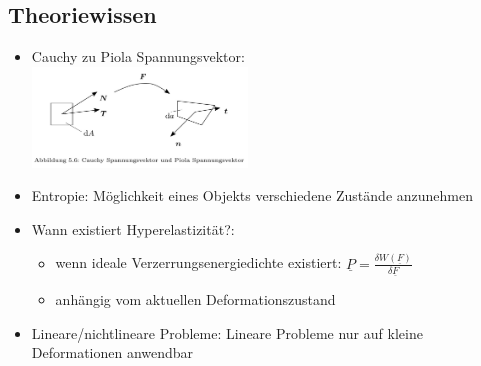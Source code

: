 \documentclass[fleqn,twoside]{article}
\begin{document}
\subsection{Theoriewissen}
\begin{itemize}
    \item Cauchy zu Piola Spannungsvektor:\\
        \includegraphics[width=0.45\textwidth]{Grafiken/Cauchy-Piola.jpg}
    \item Entropie: Möglichkeit eines Objekts verschiedene Zustände anzunehmen
    \item Wann existiert Hyperelastizität?:
        \begin{itemize}
            \item wenn ideale Verzerrungsenergiedichte existiert: $\underline{P}=\frac{\delta W (\underline{F})}{\delta \underline{F}}$
            \item anhängig vom aktuellen Deformationszustand
        \end{itemize}
    \item Lineare/nichtlineare Probleme: Lineare Probleme nur auf kleine Deformationen anwendbar
\end{itemize}

\newpage
\end{document}
